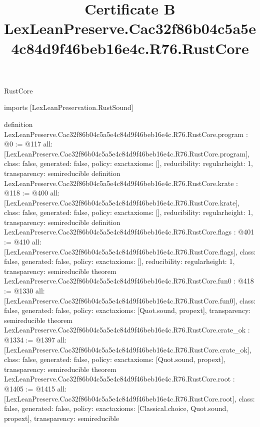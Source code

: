 \begin{lexlean}{RustCore}
\title{Certificate B LexLeanPreserve.Cac32f86b04c5a5e4c84d9f46beb16e4c.R76.RustCore}
\begin{coremodule}
imports [LexLeanPreservation.RustSound]

definition LexLeanPreserve.Cac32f86b04c5a5e4c84d9f46beb16e4c.R76.RustCore.program : @0 := @117 {
  all: [LexLeanPreserve.Cac32f86b04c5a5e4c84d9f46beb16e4c.R76.RustCore.program],
  class: false,
  generated: false,
  policy: exact{axioms: []},
  reducibility: regular{height: 1},
  transparency: semireducible
}
definition LexLeanPreserve.Cac32f86b04c5a5e4c84d9f46beb16e4c.R76.RustCore.krate : @118 := @400 {
  all: [LexLeanPreserve.Cac32f86b04c5a5e4c84d9f46beb16e4c.R76.RustCore.krate],
  class: false,
  generated: false,
  policy: exact{axioms: []},
  reducibility: regular{height: 1},
  transparency: semireducible
}
definition LexLeanPreserve.Cac32f86b04c5a5e4c84d9f46beb16e4c.R76.RustCore.flags : @401 := @410 {
  all: [LexLeanPreserve.Cac32f86b04c5a5e4c84d9f46beb16e4c.R76.RustCore.flags],
  class: false,
  generated: false,
  policy: exact{axioms: []},
  reducibility: regular{height: 1},
  transparency: semireducible
}
theorem LexLeanPreserve.Cac32f86b04c5a5e4c84d9f46beb16e4c.R76.RustCore.fun0 : @418 := @1330 {
  all: [LexLeanPreserve.Cac32f86b04c5a5e4c84d9f46beb16e4c.R76.RustCore.fun0],
  class: false,
  generated: false,
  policy: exact{axioms: [Quot.sound, propext]},
  transparency: semireducible
}
theorem LexLeanPreserve.Cac32f86b04c5a5e4c84d9f46beb16e4c.R76.RustCore.crate_ok : @1334 := @1397 {
  all: [LexLeanPreserve.Cac32f86b04c5a5e4c84d9f46beb16e4c.R76.RustCore.crate_ok],
  class: false,
  generated: false,
  policy: exact{axioms: [Quot.sound, propext]},
  transparency: semireducible
}
theorem LexLeanPreserve.Cac32f86b04c5a5e4c84d9f46beb16e4c.R76.RustCore.root : @1405 := @1415 {
  all: [LexLeanPreserve.Cac32f86b04c5a5e4c84d9f46beb16e4c.R76.RustCore.root],
  class: false,
  generated: false,
  policy: exact{axioms: [Classical.choice, Quot.sound, propext]},
  transparency: semireducible
}


\end{coremodule}
\end{lexlean}

